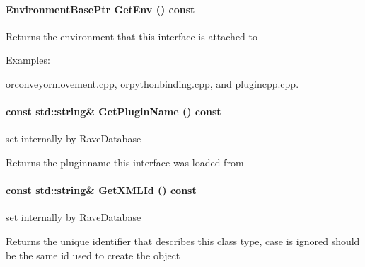 \hypertarget{classOpenRAVE_1_1InterfaceBase_a847c7f827694fd3db16f20b5669e1743}{
\paragraph[{GetEnv}]{\setlength{\rightskip}{0pt plus 5cm}EnvironmentBasePtr GetEnv () const}\hfill}
\label{classOpenRAVE_1_1InterfaceBase_a847c7f827694fd3db16f20b5669e1743}
\begin{DoxyReturn}{Returns}
the environment that this interface is attached to 
\end{DoxyReturn}
\begin{Desc}
\item[Examples: ]\par
\hyperlink{orconveyormovement_8cpp-example}{orconveyormovement.cpp}, \hyperlink{orpythonbinding_8cpp-example}{orpythonbinding.cpp}, and \hyperlink{plugincpp_8cpp-example}{plugincpp.cpp}.\end{Desc}
\hypertarget{classOpenRAVE_1_1InterfaceBase_a909d5f1a5ae6d3fbb73b69c26b3e6bb4}{
\paragraph[{GetPluginName}]{\setlength{\rightskip}{0pt plus 5cm}const std::string\& GetPluginName () const}\hfill}
\label{classOpenRAVE_1_1InterfaceBase_a909d5f1a5ae6d3fbb73b69c26b3e6bb4}
set internally by RaveDatabase \begin{DoxyReturn}{Returns}
the pluginname this interface was loaded from 
\end{DoxyReturn}
\hypertarget{classOpenRAVE_1_1InterfaceBase_a23e085422cc13cf058b9f9558a7d9de6}{
\paragraph[{GetXMLId}]{\setlength{\rightskip}{0pt plus 5cm}const std::string\& GetXMLId () const}\hfill}
\label{classOpenRAVE_1_1InterfaceBase_a23e085422cc13cf058b9f9558a7d9de6}
set internally by RaveDatabase \begin{DoxyReturn}{Returns}
the unique identifier that describes this class type, case is ignored should be the same id used to create the object 
\end{DoxyReturn}
